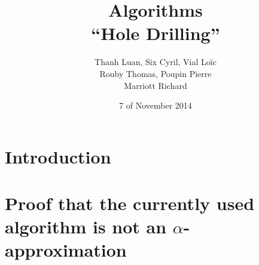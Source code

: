 \documentclass[11pt]{article}
\title{Algorithms \\
	\textbf{``Hole Drilling''}}
\author{Thanh Luan, Six Cyril, Vial Loïc \\
			Rouby Thomas, Poupin Pierre\\
			Marriott Richard}
\date{7\up{th} of November 2014}
\begin{document}
\maketitle
\tableofcontents

\section{Introduction}



\section{Proof that the currently used algorithm is not an $\alpha$-approximation}
\newcommand{\notalphagraph}[1] {
	\begin{tikzpicture}[scale=0.7]
			\def\n{#1}
			\def\height{6}
			\def\width{6}
			\foreach \x in {0,\width} {
				\foreach \y in {0,2,...,\n} {
					\draw [fill] ($(\x,\y*\height/\n)$) circle [radius=0.1];
					\draw [red,middlearrow1={latex},thick] ($(0,\y*\height/\n)$) -- ($(\width,\y*\height/\n)$);
					\ifnum \y > 0 {
						\draw [red,middlearrow1={latex},thick] ($(\width,\y*\height/\n)$) -- ($(\width,\y*\height/\n - \height/\n)$);
						\draw [red,middlearrow1={latex},thick] ($(\width,\y*\height/\n - \height/\n)$) -- ($(0,\y*\height/\n - \height/\n)$);
						\draw [red,middlearrow1={latex},thick] ($(0,\y*\height/\n - \height/\n)$) -- ($(0,\y*\height/\n - \height/\n - \height/\n)$);
					} \else
					\fi
				}
			}
			\draw [red,middlearrow1={latex},thick] (0,0) -- (\width,0);

			\foreach \x in {0,\width} {
				\foreach \y in {0,...,\n} {
					\draw [fill] ($(\x,\y*\height/\n)$) circle [radius=0.1];
				}
			}
			\draw [blue,middlearrow2={latex},thick] (0.05,\height+0.05) -- (0.05,0.05);
			\draw [blue,middlearrow2={latex},thick] (0.05,0.05) -- (\width+0.05,0.05);
			\draw [blue,middlearrow2={latex},thick] (\width+0.05,0.05) -- (\width+0.05,\height+0.05);
		\end{tikzpicture}
}

\newcommand{\notAlphaGraphOnlyRed}[1] {
	\begin{tikzpicture}[scale=0.85]
			\def\n{#1}
			\def\height{5}
			\def\width{5}
			\foreach \x in {0,\width} {
				\foreach \y in {0,...,\n} {
					\draw [fill] ($(\x,\y*\height/\n)$) circle [radius=0.1];
					\draw [red,middlearrow1={latex},thick] ($(0,\y*\height/\n)$) -- ($(\width,\y*\height/\n)$);
					\ifnum \y > 0 {
						\draw [red,middlearrow1={latex},thick] ($(\width,\y*\height/\n)$) -- ($(0,\y*\height/\n - \height/\n)$);
					} \else
					\fi
				}
			}
		\end{tikzpicture}
}
\end{document}
